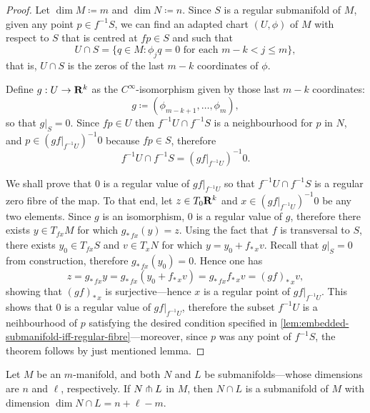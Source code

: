 \begin{proof}
Let \(\dim M \coloneq m\) and \(\dim N \coloneq n\). Since \(S\) is a regular
submanifold of \(M\), given any point \(p \in f^{-1} S\), we can find an adapted
chart \((U, \phi)\) of \(M\) with respect to \(S\) that is centred at
\(f p \in S\) and such that
\[
U \cap S = \{q \in M \colon \phi_j q = 0 \text{ for each } m - k < j \leq m\},
\]
that is, \(U \cap S\) is the zeros of the last \(m-k\) coordinates of \(\phi\).

Define \(g: U \to \mathbf{R}^k\) as the \(C^{\infty}\)-isomorphism given by those last
\(m-k\) coordinates:
\[
g \coloneq (\phi_{m-k+1}, \dots, \phi_m),
\]
so that \(g|_S = 0\). Since \(f p \in U\) then
\(f^{-1} U \cap f^{-1} S\) is a neighbourhood for \(p\) in \(N\), and
\(p \in (g f|_{f^{-1} U})^{-1} 0\) because \(f p \in S\), therefore
\[
f^{-1} U \cap f^{-1} S = (g f|_{f^{-1} U})^{-1} 0.
\]

We shall prove that \(0\) is a regular value of \(g f|_{f^{-1} U}\) so that
\(f^{-1} U \cap f^{-1} S\) is a regular zero fibre of the map. To that
end, let \(z \in T_0 \mathbf{R}^k\) and \(x \in (g f|_{f^{-1} U})^{-1} 0\) be any
two elements. Since \(g\) is an isomorphism, \(0\) is a regular value of \(g\),
therefore there exists \(y \in T_{f x} M\) for which \(g_{*\, f x}(y) =
z\). Using the fact that \(f\) is transversal to \(S\), there exists
\(y_0 \in T_{f x} S\) and \(v \in T_x N\) for which \(y = y_0 + f_{*\, x}
v\). Recall that \(g|_S = 0\) from construction, therefore
\(g_{*\, f x}(y_0) = 0\). Hence one has
\[
z = g_{*\, f x} y
= g_{*\, f x}(y_0 + f_{*\, x} v)
= g_{*\, f x} f_{*\, x} v
= (g f)_{*\, x} v,
\]
showing that \((g f)_{*\, x}\) is surjective---hence \(x\) is a regular point of
\(g f|_{f^{-1} U}\). This shows that \(0\) is a regular value of
\(g f|_{f^{-1} U}\), therefore the subset \(f^{-1} U\) is a
neihbourhood of \(p\) satisfying the desired condition specified in
\cref{lem:embedded-submanifold-iff-regular-fibre}---moreover, since \(p\) was any
point of \(f^{-1} S\), the theorem follows by just mentioned lemma.
\end{proof}

\begin{theorem}
\label{thm:transversal-intersection-theorem}
Let \(M\) be an \(m\)-manifold, and both \(N\) and \(L\) be submanifolds---whose
dimensions are \(n\) and \(\ell\), respectively. If \(N \pitchfork L\) in \(M\),
then \(N \cap L\) is a submanifold of \(M\) with dimension
\(\dim N \cap L = n + \ell - m\).
\end{theorem}

